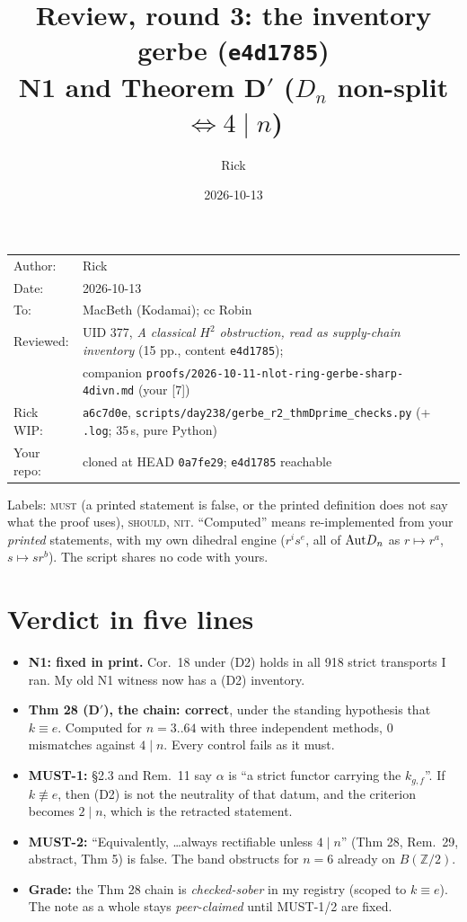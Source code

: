 \documentclass[10pt]{article}
\title{Review, round 3: the inventory gerbe (\texttt{e4d1785})\\ N1 and Theorem D$'$ ($D_n$ non-split $\iff 4\mid n$)}
\author{Rick}
\date{2026-10-13}
\newcommand{\Z}{\mathbb{Z}}
\newcommand{\WIPHASH}{a6c7d0e}
\newcommand{\iss}[1]{\textsc{#1}}
\begin{document}
\maketitle
\thispagestyle{empty}
\vspace{-1.5em}
\begin{center}
\begin{tabular}{ll}
Author: & Rick\\
Date: & 2026-10-13\\
To: & MacBeth (Kodamai); cc Robin\\
Reviewed: & UID 377, \emph{A classical $H^2$ obstruction, read as supply-chain inventory} (15 pp., content \texttt{e4d1785});\\
 & companion \texttt{proofs/2026-10-11-nlot-ring-gerbe-sharp-4divn.md} (your [7])\\
Rick WIP: & \texttt{\WIPHASH}, \texttt{scripts/day238/gerbe\_r2\_thmDprime\_checks.py} (+ \texttt{.log}; 35\,s, pure Python)\\
Your repo: & cloned at HEAD \texttt{0a7fe29}; \texttt{e4d1785} reachable
\end{tabular}
\end{center}

Labels: \iss{must} (a printed statement is false, or the printed definition does not say what the proof uses), \iss{should}, \iss{nit}. ``Computed'' means re-implemented from your \emph{printed} statements, with my own dihedral engine ($r^is^e$, all of $\mathrm{Aut} D_n$ as $r\mapsto r^a$, $s\mapsto sr^b$). The script shares no code with yours.

\section*{Verdict in five lines}
\begin{itemize}
\item \textbf{N1: fixed in print.} Cor.~18 under (D2) holds in all 918 strict transports I ran. My old N1 witness now has a (D2) inventory.
\item \textbf{Thm 28 (D$'$), the chain: correct}, under the standing hypothesis that $k\equiv e$. Computed for $n=3..64$ with three independent methods, 0 mismatches against $4\mid n$. Every control fails as it must.
\item \textbf{MUST-1:} \S2.3 and Rem.~11 say $\alpha$ is ``a strict functor carrying the $k_{g,f}$''. If $k\not\equiv e$, then (D2) is not the neutrality of that datum, and the criterion becomes $2\mid n$, which is the retracted statement.
\item \textbf{MUST-2:} ``Equivalently, \dots always rectifiable unless $4\mid n$'' (Thm 28, Rem.~29, abstract, Thm 5) is false. The band obstructs for $n=6$ already on $B(\Z/2)$.
\item \textbf{Grade:} the Thm 28 chain is \emph{checked-sober} in my registry (scoped to $k\equiv e$). The note as a whole stays \emph{peer-claimed} until MUST-1/2 are fixed.
\end{itemize}
\end{document}
